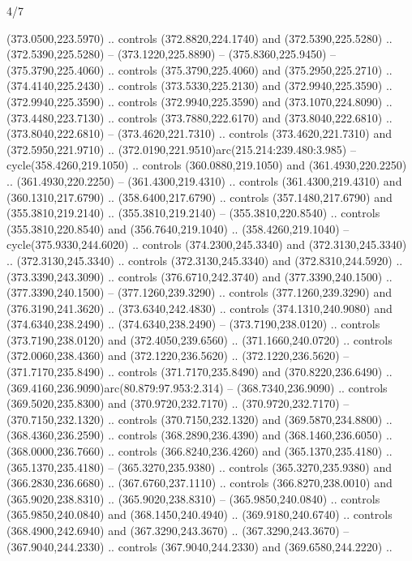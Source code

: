 \begin{flagdescription}{4/7}
\begin{scope}[shift={(0.5\flaglength,0.5\flagwidth)},scale=\flagwidth*\stretchfactor/820]
\begin{scope}[scale=1.87,xshift=-138mm,yshift=75mm]
\begin{scope}[y=0.8pt, x=0.8pt, yscale=-1, xscale=1]
\begin{scope}[cm={{1.16833,0.0,0.0,1.16833,(-0.699,1.184)}},fill=c78732e]
  (373.0500,223.5970) .. controls (372.8820,224.1740) and (372.5390,225.5280) ..
  (372.5390,225.5280) -- (373.1220,225.8890) -- (375.8360,225.9450) --
  (375.3790,225.4060) .. controls (375.3790,225.4060) and (375.2950,225.2710) ..
  (374.4140,225.2430) .. controls (373.5330,225.2130) and (372.9940,225.3590) ..
  (372.9940,225.3590) .. controls (372.9940,225.3590) and (373.1070,224.8090) ..
  (373.4480,223.7130) .. controls (373.7880,222.6170) and (373.8040,222.6810) ..
  (373.8040,222.6810) -- (373.4620,221.7310) .. controls (373.4620,221.7310) and
  (372.5950,221.9710) .. (372.0190,221.9510)arc(215.214:239.480:3.985) --
  cycle(358.4260,219.1050) .. controls (360.0880,219.1050) and
  (361.4930,220.2250) .. (361.4930,220.2250) -- (361.4300,219.4310) .. controls
  (361.4300,219.4310) and (360.1310,217.6790) .. (358.6400,217.6790) .. controls
  (357.1480,217.6790) and (355.3810,219.2140) .. (355.3810,219.2140) --
  (355.3810,220.8540) .. controls (355.3810,220.8540) and (356.7640,219.1040) ..
  (358.4260,219.1040) -- cycle(375.9330,244.6020) .. controls
  (374.2300,245.3340) and (372.3130,245.3340) .. (372.3130,245.3340) .. controls
  (372.3130,245.3340) and (372.8310,244.5920) .. (373.3390,243.3090) .. controls
  (376.6710,242.3740) and (377.3390,240.1500) .. (377.3390,240.1500) --
  (377.1260,239.3290) .. controls (377.1260,239.3290) and (376.3190,241.3620) ..
  (373.6340,242.4830) .. controls (374.1310,240.9080) and (374.6340,238.2490) ..
  (374.6340,238.2490) -- (373.7190,238.0120) .. controls (373.7190,238.0120) and
  (372.4050,239.6560) .. (371.1660,240.0720) .. controls (372.0060,238.4360) and
  (372.1220,236.5620) .. (372.1220,236.5620) -- (371.7170,235.8490) .. controls
  (371.7170,235.8490) and (370.8220,236.6490) ..
  (369.4160,236.9090)arc(80.879:97.953:2.314) -- (368.7340,236.9090) .. controls
  (369.5020,235.8300) and (370.9720,232.7170) .. (370.9720,232.7170) --
  (370.7150,232.1320) .. controls (370.7150,232.1320) and (369.5870,234.8800) ..
  (368.4360,236.2590) .. controls (368.2890,236.4390) and (368.1460,236.6050) ..
  (368.0000,236.7660) .. controls (366.8240,236.4260) and (365.1370,235.4180) ..
  (365.1370,235.4180) -- (365.3270,235.9380) .. controls (365.3270,235.9380) and
  (366.2830,236.6680) .. (367.6760,237.1110) .. controls (366.8270,238.0010) and
  (365.9020,238.8310) .. (365.9020,238.8310) -- (365.9850,240.0840) .. controls
  (365.9850,240.0840) and (368.1450,240.4940) .. (369.9180,240.6740) .. controls
  (368.4900,242.6940) and (367.3290,243.3670) .. (367.3290,243.3670) --
  (367.9040,244.2330) .. controls (367.9040,244.2330) and (369.6580,244.2220) ..

\end{scope}
\end{scope}
\end{scope}
\end{scope}
\end{flagdescription}
